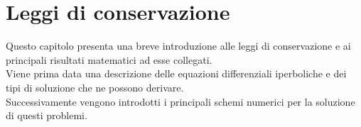 \chapter{Leggi di conservazione} \label{cap:LeggiConservazione}
\rhead[]{\fancyplain{}{\footnotesize{\leftmark}}}
\lfoot[\fancyplain{}{\bf \thepage}]{}
\cfoot{} %
\rfoot[]{\fancyplain{}{\bf \thepage}}


Questo capitolo presenta una breve introduzione alle leggi di conservazione e ai principali risultati matematici ad esse collegati. \\
\noindent Viene prima data una descrizione delle equazioni differenziali iperboliche e dei tipi di soluzione che ne possono derivare. \\
\noindent Successivamente vengono introdotti i principali schemi numerici per la soluzione di questi problemi.


